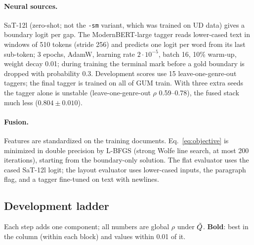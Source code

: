 \paragraph{Neural sources.} SaT-12l (zero-shot; not the \texttt{-sm} variant, which was trained on UD data) gives a
boundary logit per gap. The ModernBERT-large tagger reads lower-cased text in windows of 510 tokens (stride 256) and
predicts one logit per word from its last sub-token; 3 epochs, AdamW, learning rate $2\cdot 10^{-5}$, batch 16, 10\%
warm-up, weight decay 0.01; during training the terminal mark before a gold boundary is dropped with probability 0.3.
Development scores use 15 leave-one-genre-out taggers; the final tagger is trained on all of GUM train. With three extra
seeds the tagger alone is unstable (leave-one-genre-out $\rho$ 0.59--0.78), the fused stack much less ($0.804 \pm 0.010$).

\paragraph{Fusion.} Features are standardized on the training documents. Eq.~\ref{eq:objective} is minimized in double
precision by L-BFGS (strong Wolfe line search, at most 200 iterations), starting from the boundary-only solution. The
flat evaluator uses the cased SaT-12l logit; the layout evaluator uses lower-cased inputs, the paragraph flag, and a
tagger fine-tuned on text with newlines.

\subsection{Development ladder}
\label{app:ladder}
Each step adds one component; all numbers are global $\rho$ under $\tilde{Q}$. \textbf{Bold}: best in the column (within
each block) and values within 0.01 of it.

